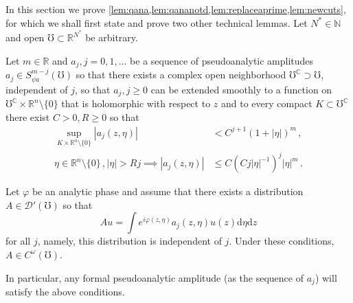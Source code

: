 \documentclass[
	fontsize=11pt, 
	twoside=false, 
	abstract=true, 
	a4paper,
]{scrartcl}
\newcommand{\eps}{\varepsilon}
\newcommand{\sem}{\setminus\{0\}}
\newcommand{\RR}{\mathbb{R}}
\newcommand{\CC}{\mathbb{C}}
\newcommand{\dd}{\mathrm{d}}
\newcommand{\abs}[1]{\left\lvert#1\right\rvert}
\begin{document}
In this section we prove \cref{lem:qana,lem:qananotd,lem:replaceaprime,lem:newcuts}, for which we shall first state and prove two other technical lemmas. Let $N^\ast \in \mathbb{N}$ and open $\mho \subset \RR^{N^\ast}$ be arbitrary.
\begin{lemma}\label{lem:manyamplitudes}
	Let $m\in \RR$ and $a_j, j = 0,1,\dots$ be a sequence of pseudoanalytic amplitudes $a_j \in S^{m-j}_{\psi a}(\mho)$ so that there exists a complex open neighborhood $\mho^{\CC}\supset \mho$, independent of $j$, so that $a_j, j\geq 0$ can be extended smoothly to a function on $\mho^{\CC}\times\RR^n\sem$ that is holomorphic with respect to $z$ and to every compact $K \subset \mho^{\CC}$ there exist $C >0, R\geq 0$ so that
	\begin{align}
		\sup_{K \times \RR^n\sem} \abs{a_j(z,\eta)} &< C^{j+1}\left(1+\abs{\eta}\right)^{m}\,,\label{eq:no1}\\%
		\eta\in \RR^n\sem\,,\abs{\eta} > Rj \implies \abs{a_j(z,\eta)} &\leq C\left(C j \abs{\eta}^{-1}\right)^{j}  \abs{\eta}^{m}\,.\label{eq:no2}
	\end{align}
	
	Let $\varphi$ be an analytic phase and assume that there exists a distribution $A\in \mathcal{D}'(\mho)$ so that
	\[
		Au = \int e^{i\varphi(z,\eta)}a_j(z,\eta) u(z)\dd\eta\dd z
	\]
	for all $j$, namely, this distribution is independent of $j$. Under these conditions, $A\in C^\omega(\mho)$.
\end{lemma}
In particular, any formal pseudoanalytic amplitude (as the sequence of $a_j$) will satisfy the above conditions.
\end{document}
